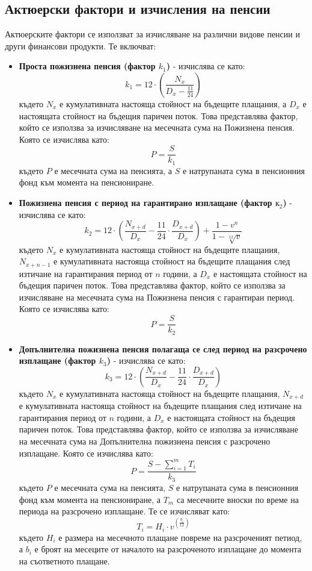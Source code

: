 \documentclass[a4paper,12pt]{article}
\begin{document}
\subsection{Актюерски фактори и изчисления на пенсии}
Актюерските фактори се използват за изчисляване на различни видове пенсии и други финансови продукти. Те включват:
\begin{itemize}
        \item \textbf{Проста пожизнена пенсия (фактор $k_1$)} - изчислява се като:
              \[k_1 = 12\cdot\left(\frac{N_{x}}{D_{x}-\frac{11}{24}}\right)\]
              където $N_x$ е кумулативната настояща стойност на бъдещите плащания, а $D_x$ е настоящата стойност на бъдещия паричен поток. Това представлява фактор, който се използва за изчисляване на месечната сума на Пожизнена пенсия. Която се изчислява като:
              \[P = \frac{S}{k_1}\]
              където $P$ е месечната сума на пенсията, а $S$ е натрупаната сума в пенсионния фонд към момента на пенсиониране.
        \item \textbf{Пожизнена пенсия с  период на гарантирано изплащане (фактор $к_2$)} - изчислява се като:
              \[k_2 = 12\cdot\left(\frac{N_{x+d}}{D_x} - \frac{11}{24}\cdot \frac{D_{x+d}}{D_{x}}\right)+\frac{1-v^n}{1-\sqrt[12]{v}}\]
              където $N_x$ е кумулативната настояща стойност на бъдещите плащания, $N_{x+n-1}$ е кумулативната настояща стойност на бъдещите плащания след изтичане на гарантирания период от $n$ години, а $D_x$ е настоящата стойност на бъдещия паричен поток. Това представлява фактор, който се използва за изчисляване на месечната сума на Пожизнена пенсия с гарантиран период. Която се изчислява като:
              \[P = \frac{S}{k_2}\]
        \item \textbf{Допълнителна пожизнена пенсия полагаща се след период на разсрочено изплащане (фактор $k_3$)} - изчислява се като:
              \[k_3 = 12\cdot\left(\frac{N_{x+d}}{D_{x}} - \frac{11}{24}\cdot\frac{
                              D_{x+d}}{D_{x}}\right)\]
              където $N_x$ е кумулативната настояща стойност на бъдещите плащания, $N_{x+d}$ е кумулативната настояща стойност на бъдещите плащания след изтичане на гарантирания период от $n$ години, а $D_x$ е настоящата стойност на бъдещия паричен поток. Това представлява фактор, който се използва за изчисляване на месечната сума на Допълнителна пожизнена пенсия с разсрочено изплащане. Която се изчислява като:
              \[P = \frac{S-\sum_{i=1}^{m}T_i}{k_3}\]
              където $P$ е месечната сума на пенсията, $S$ е натрупаната сума в пенсионния фонд към момента на пенсиониране, а $T_m$ са месечните вноски по време на периода на разсрочено изплащане. Те се изчисляват като:
              \[T_i= H_i \cdot v^{(\frac{b_i}{12})}\]
              където $H_i$ е размера на месечното плащане повреме на разсроченият петиод, а $b_i$ е броят на месеците от началото на разсроченото изплащане до момента на съответното плащане. 
\end{itemize}
\newpage
\end{document}
